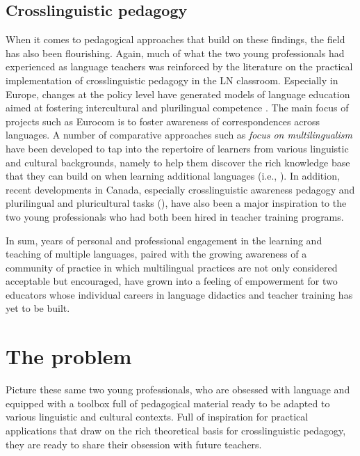 \documentclass[output=paper]{../langscibook}
\begin{document}
\subsection{Crosslinguistic pedagogy}



When it comes to pedagogical approaches that build on these findings, the field has also been flourishing. Again, much of what the two young professionals had experienced as language teachers was reinforced by the literature on the practical implementation of crosslinguistic pedagogy in the LN classroom. Especially in Europe, changes at the policy level have generated models of language education aimed at fostering intercultural and plurilingual competence \citep{Candelier2007}. The main focus of projects such as Eurocom \citep{HufeisenMarx2007} is to foster awareness of correspondences across languages. A number of comparative approaches such as \emph{focus on multilingualism} \citep{CenozGorter2014} have been developed to tap into the repertoire of learners from various linguistic and cultural backgrounds, namely to help them discover the rich knowledge base that they can build on when learning additional languages (i.e., \citealt{LeonetEtAl2020}). In addition, recent developments in Canada, especially crosslinguistic awareness pedagogy \citep{HorstEtAl2010} and plurilingual and pluricultural tasks (\citealt{GalanteEtAl2019,GalanteEtAl2020}), have also been a major inspiration to the two young professionals who had both been hired in teacher training programs.

In sum, years of personal and professional engagement in the learning and teaching of multiple languages, paired with the growing awareness of a community of practice in which multilingual practices are not only considered acceptable but encouraged, have grown into a feeling of empowerment for two educators whose individual careers in language didactics and teacher training has yet to be built.


\section{The problem}
Picture these same two young professionals, who are obsessed with language and equipped with a toolbox full of pedagogical material ready to be adapted to various linguistic and cultural contexts. Full of inspiration for practical applications that draw on the rich theoretical basis for crosslinguistic pedagogy, they are ready to share their obsession with future teachers. 
\end{document}
